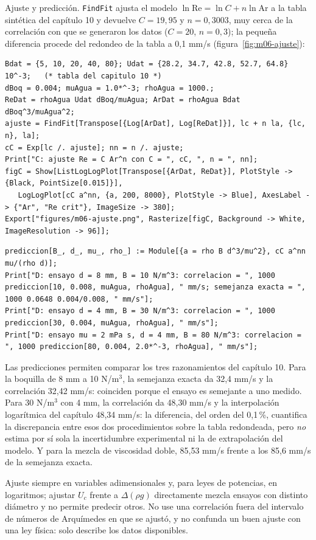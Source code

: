 \documentclass[10pt,openany]{book}
\begin{document}
Ajuste y predicción. \texttt{FindFit} ajusta el modelo \(\ln\mathrm{Re} = \ln C + n\ln\mathrm{Ar}\) a la tabla sintética del capítulo 10 y devuelve \(C = 19{,}95\) y \(n = 0{,}3003\), muy cerca de la correlación con que se generaron los datos (\(C = 20\), \(n = 0{,}3\)); la pequeña diferencia procede del redondeo de la tabla a 0,1 mm/s (figura~\ref{fig:m06-ajuste}):
\begin{lstlisting}[style=studium]
Bdat = {5, 10, 20, 40, 80}; Udat = {28.2, 34.7, 42.8, 52.7, 64.8} 10^-3;   (* tabla del capitulo 10 *)
dBoq = 0.004; muAgua = 1.0*^-3; rhoAgua = 1000.;
ReDat = rhoAgua Udat dBoq/muAgua; ArDat = rhoAgua Bdat dBoq^3/muAgua^2;
ajuste = FindFit[Transpose[{Log[ArDat], Log[ReDat]}], lc + n la, {lc, n}, la];
cC = Exp[lc /. ajuste]; nn = n /. ajuste;
Print["C: ajuste Re = C Ar^n con C = ", cC, ", n = ", nn];
figC = Show[ListLogLogPlot[Transpose[{ArDat, ReDat}], PlotStyle -> {Black, PointSize[0.015]}],
   LogLogPlot[cC a^nn, {a, 200, 8000}, PlotStyle -> Blue], AxesLabel -> {"Ar", "Re crit"}, ImageSize -> 380];
Export["figures/m06-ajuste.png", Rasterize[figC, Background -> White, ImageResolution -> 96]];
\end{lstlisting}
\begin{lstlisting}[style=studium]
prediccion[B_, d_, mu_, rho_] := Module[{a = rho B d^3/mu^2}, cC a^nn mu/(rho d)];
Print["D: ensayo d = 8 mm, B = 10 N/m^3: correlacion = ", 1000 prediccion[10, 0.008, muAgua, rhoAgua], " mm/s; semejanza exacta = ", 1000 0.0648 0.004/0.008, " mm/s"];
Print["D: ensayo d = 4 mm, B = 30 N/m^3: correlacion = ", 1000 prediccion[30, 0.004, muAgua, rhoAgua], " mm/s"];
Print["D: ensayo mu = 2 mPa s, d = 4 mm, B = 80 N/m^3: correlacion = ", 1000 prediccion[80, 0.004, 2.0*^-3, rhoAgua], " mm/s"];
\end{lstlisting}
Las predicciones permiten comparar los tres razonamientos del capítulo 10. Para la boquilla de 8 mm a 10 N/m\(^3\), la semejanza exacta da 32,4 mm/s y la correlación 32,42 mm/s: coinciden porque el ensayo es semejante a uno medido. Para 30 N/m\(^3\) con 4 mm, la correlación da 48,30 mm/s y la interpolación logarítmica del capítulo 48,34 mm/s: la diferencia, del orden del 0,1\,\%, cuantifica la discrepancia entre esos dos procedimientos sobre la tabla redondeada, pero \emph{no} estima por sí sola la incertidumbre experimental ni la de extrapolación del modelo. Y para la mezcla de viscosidad doble, 85,53 mm/s frente a los 85,6 mm/s de la semejanza exacta.

\begin{tcolorbox}[title={Consejo}, studiumtip, breakable]

Ajuste siempre en variables adimensionales y, para leyes de potencias, en logaritmos; ajustar \(U_c\) frente a \(\Delta(\rho g)\) directamente mezcla ensayos con distinto diámetro y no permite predecir otros. No use una correlación fuera del intervalo de números de Arquímedes en que se ajustó, y no confunda un buen ajuste con una ley física: solo describe los datos disponibles.
\end{tcolorbox}
\end{document}
